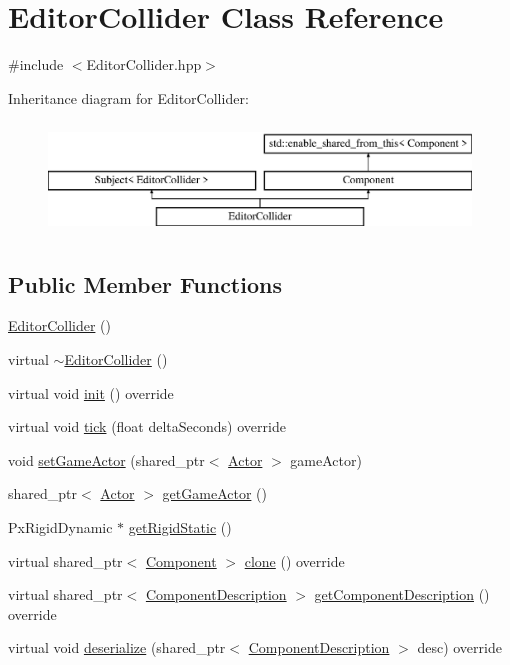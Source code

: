 \hypertarget{class_editor_collider}{}\section{Editor\+Collider Class Reference}
\label{class_editor_collider}


{\ttfamily \#include $<$Editor\+Collider.\+hpp$>$}

Inheritance diagram for Editor\+Collider\+:\begin{figure}[H]
\begin{center}
\leavevmode
\includegraphics[height=3.000000cm]{class_editor_collider}
\end{center}
\end{figure}
\subsection*{Public Member Functions}
\begin{DoxyCompactItemize}
\item 
\hyperlink{class_editor_collider_a2f042fd2b14c9e45aa7227568d795424}{Editor\+Collider} ()
\item 
virtual \hyperlink{class_editor_collider_a2dbee537bb0ce1f9b57d78b1c60431d5}{$\sim$\+Editor\+Collider} ()
\item 
virtual void \hyperlink{class_editor_collider_a6581dd66dd2881b0faafe6975b4a188c}{init} () override
\item 
virtual void \hyperlink{class_editor_collider_a0ffb1252a656a1ec84d3492052bf3cee}{tick} (float delta\+Seconds) override
\item 
void \hyperlink{class_editor_collider_ad93e80e2f9faf19633976f1694740bc2}{set\+Game\+Actor} (shared\+\_\+ptr$<$ \hyperlink{class_actor}{Actor} $>$ game\+Actor)
\item 
shared\+\_\+ptr$<$ \hyperlink{class_actor}{Actor} $>$ \hyperlink{class_editor_collider_ac2feb06d18c27ca29f06d5a70e48f9a1}{get\+Game\+Actor} ()
\item 
Px\+Rigid\+Dynamic $\ast$ \hyperlink{class_editor_collider_a0f422a9ae779f98053e18a1bec4a200a}{get\+Rigid\+Static} ()
\item 
virtual shared\+\_\+ptr$<$ \hyperlink{class_component}{Component} $>$ \hyperlink{class_editor_collider_abfee383f62b5bc06afffe5beedb729e3}{clone} () override
\item 
virtual shared\+\_\+ptr$<$ \hyperlink{class_component_description}{Component\+Description} $>$ \hyperlink{group__serialization__functions_gac3df1d451d142f9ec123c0439cd503eb}{get\+Component\+Description} () override
\item 
virtual void \hyperlink{group__serialization__functions_ga9b02f2f116742850f196d8fc84e50af8}{deserialize} (shared\+\_\+ptr$<$ \hyperlink{class_component_description}{Component\+Description} $>$ desc) override
\end{DoxyCompactItemize}
